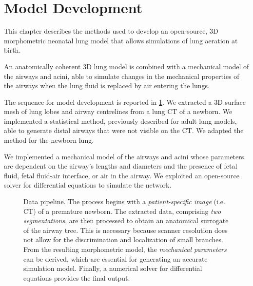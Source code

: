 
\section{Model Development}
\label{sec:model_development}




This chapter describes the methods used to develop an open-source, 3D
morphometric neonatal lung model that allows simulations of lung
aeration at birth.

An anatomically coherent 3D lung model is combined with a mechanical
model of the airways and acini, able to simulate changes in the
mechanical properties of the airways when the lung fluid is replaced
by air entering the lungs.

The sequence for model development is reported in
\cref{fig:data_pipeline}. We extracted a 3D surface mesh of lung lobes
and airway centrelines from a lung CT of a newborn. We implemented a
statistical method, previously described for adult lung models, able
to generate distal airways that were not visible on the CT. We adapted
the method for the newborn lung.

We implemented a mechanical model of the airways and acini whose
parameters are dependent on the airway's lengths and diameters and the
presence of fetal fluid, fetal fluid-air interface, or air in the
airway. We exploited an open-source solver for differential equations
to simulate the network.

\begin{figure}[H]\centering
  
  \caption{Data pipeline.  The process begins with a
    \emph{patient-specific image} (i.e. CT) of a premature newborn.
    The extracted data, comprising \emph{two segmentations}, are then
    processed to obtain an anatomical surrogate of the airway tree.
    This is necessary because scanner resolution does not allow for the
    discrimination and localization of small branches.  From the
    resulting morphometric model, the \emph{mechanical parameters} can
    be derived, which are essential for generating an accurate
    simulation model.  Finally, a numerical solver for differential
    equations provides the final output.}
  \label{fig:data_pipeline}
\end{figure}
  
